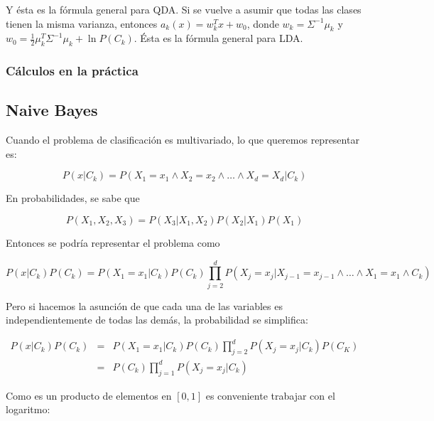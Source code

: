 Y ésta es la fórmula general para QDA. Si se vuelve a asumir que todas las clases tienen la misma varianza, entonces $a_k(x) = w_k^Tx + w_0$, donde $w_k = \Sigma^{-1}\mu_k$ y $w_0 = \frac{1}{2}\mu_k^T\Sigma^{-1}\mu_k + \ln P(C_k)$. Ésta es la fórmula general para LDA.

\subsubsection{Cálculos en la práctica}



\subsection{Naive Bayes}
Cuando el problema de clasificación es multivariado, lo que queremos representar es:

\begin{equation*}
    P(x | C_k) = P(X_1 = x_1 \wedge X_2 = x_2 \wedge \dots \wedge X_d = X_d | C_k)
\end{equation*}

En probabilidades, se sabe que

\begin{equation*}
    P(X_1,X_2,X_3) = P(X_3 | X_1,X_2) P(X_2 | X_1) P(X_1)
\end{equation*}

Entonces se podría representar el problema como

\begin{equation*}
    P(x | C_k )P(C_k) =
    P(X_1 = x_1 | C_k)P(C_k)
    \prod_{j = 2}^{d} P(X_j = x_j | X_{j - 1} = x_{j - 1} \wedge \dots \wedge X_1 = x_1 \wedge C_k)
\end{equation*}


Pero si hacemos la asunción de que cada una de las variables es independientemente de todas las demás, la probabilidad se simplifica:

\begin{eqnarray*}
    P(x|C_k)P(C_k) &=&
    P(X_1 = x_1 | C_k)P(C_k)
    \prod_{j = 2}^{d} P(X_j = x_j | C_k)P(C_K) \\
    &=&
    P(C_k)\prod_{j = 1}^{d} P(X_j = x_j | C_k)
\end{eqnarray*}



Como es un producto de elementos en $[0,1]$ es conveniente trabajar con el logaritmo:

